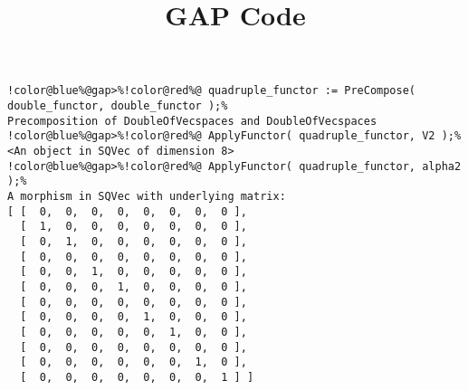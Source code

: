\documentclass[12pt]{amsart}
\title{GAP Code}
\author{}
\begin{document}
\maketitle

\begin{Verbatim}[commandchars=!@\%,frame=single]
!color@blue%@gap>%!color@red%@ quadruple_functor := PreCompose( double_functor, double_functor );%
Precomposition of DoubleOfVecspaces and DoubleOfVecspaces
!color@blue%@gap>%!color@red%@ ApplyFunctor( quadruple_functor, V2 );%
<An object in SQVec of dimension 8>
!color@blue%@gap>%!color@red%@ ApplyFunctor( quadruple_functor, alpha2 );%
A morphism in SQVec with underlying matrix:
[ [  0,  0,  0,  0,  0,  0,  0,  0 ],
  [  1,  0,  0,  0,  0,  0,  0,  0 ],
  [  0,  1,  0,  0,  0,  0,  0,  0 ],
  [  0,  0,  0,  0,  0,  0,  0,  0 ],
  [  0,  0,  1,  0,  0,  0,  0,  0 ],
  [  0,  0,  0,  1,  0,  0,  0,  0 ],
  [  0,  0,  0,  0,  0,  0,  0,  0 ],
  [  0,  0,  0,  0,  1,  0,  0,  0 ],
  [  0,  0,  0,  0,  0,  1,  0,  0 ],
  [  0,  0,  0,  0,  0,  0,  0,  0 ],
  [  0,  0,  0,  0,  0,  0,  1,  0 ],
  [  0,  0,  0,  0,  0,  0,  0,  1 ] ]

\end{Verbatim}
\end{document}
